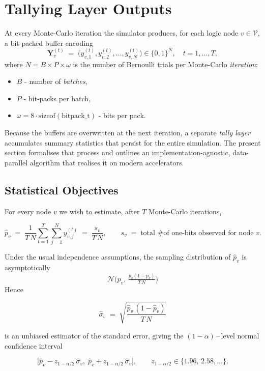 \section{Tallying Layer Outputs}
\label{sec:tally_kernel}

At every Monte-Carlo iteration the simulator produces, for each logic node
\(v\in \mathcal{V}\), a bit-packed buffer encoding
\[
  \mathbf{Y}_v^{(t)}
  \;=\;
  \bigl(y_{v,1}^{(t)}, y_{v,2}^{(t)},\dots, y_{v,N}^{(t)}\bigr)
  \in\{0,1\}^N,
  \quad t = 1,\dots,T,
\]
where \(N\!=\!B\!\times\!P\!\times\!\omega\) is the number of Bernoulli trials
per Monte-Carlo \emph{iteration}:
\begin{itemize}
    \item \(B\) - number of \emph{batches},
    \item \(P\) - bit-packs per batch,
    \item \(\omega\!=\!8\cdot\mathrm{sizeof}(\text{bitpack\_t})\) - bits per pack.
\end{itemize}
Because the buffers are overwritten at the next iteration, a
separate \emph{tally layer} accumulates summary statistics that persist for the
entire simulation.  The present section formalises that process and outlines
an implementation-agnostic, data-parallel algorithm that realises it on modern
accelerators.

\subsection{Statistical Objectives}
\label{subsec:tally_objective}

For every node \(v\) we wish to estimate, after \(T\) Monte-Carlo iterations,

\[
  \widehat{p}_v
  \;=\;
  \frac{1}{T\,N}
  \sum_{t=1}^{T}\sum_{j=1}^{N} y_{v,j}^{(t)}
  \;=\;
  \frac{s_v}{T\,N},
  \qquad
  s_v \;=\; \text{total \# of one-bits observed for node \(v\)}.
\]

Under the usual independence assumptions, the sampling distribution of
\(\widehat{p}_v\) is asymptotically
\[
\mathcal{N}\!\bigl(p_v,\,
  \tfrac{p_v(1-p_v)}{T\,N}\bigr)
\]
Hence

\[
  \widehat{\sigma}_v
  \;=\;
  \sqrt{\frac{\widehat{p}_v\,(1-\widehat{p}_v)}{T\,N}}
\]

is an unbiased estimator of the standard error, giving the
\((1-\alpha)\)\,--\,level normal confidence interval

\[
  \bigl[
    \widehat{p}_v - z_{1-\alpha/2}\,\widehat{\sigma}_v,\;
    \widehat{p}_v + z_{1-\alpha/2}\,\widehat{\sigma}_v
  \bigr],
  \qquad
  z_{1-\alpha/2}\in\{1.96,\,2.58,\dots\}.
\]


